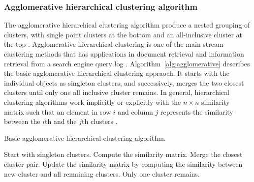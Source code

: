 \subsubsection{Agglomerative hierarchical clustering algorithm}
The agglomerative hierarchical clustering algorithm produce a nested grouping of clusters, with single point clusters at the bottom and an all-inclusive cluster at the top \cite{karypis1999chameleon}. Agglomerative hierarchical clustering is one of the main stream clustering methods \cite{day1984efficient} that has applications in document retrieval \cite{voorhees1986implementing} and information retrieval from a search engine query log \cite{beeferman2000agglomerative}. Algorithm~\ref{alg:agglomerative} describes the basic agglomerative hierarchical clustering appraoch. It starts with the individual objects as singleton clusters, and successively, merges the two closest clusters until only one all inclusive cluster remains. In general, hierarchical clustering algorithms work implicitly or explicitly with the $n \times n$ similarity matrix such that an element in row $i$ and column $j$ represents the similarity between the $i$th and the $j$th clusters \cite{karypis1999chameleon}.


\begin{algorithm}
\caption{Basic agglomerative hierarchical clustering algorithm.} \label{alg:agglomerative}
\begin{algorithmic}[1]
\State Start with singleton clusters.
\State Compute the similarity matrix.
\Repeat
\State Merge the closest cluster pair.
\State Update the similarity matrix by computing the similarity between new cluster and all remaining clusters.
\Until Only one cluster remains.
\end{algorithmic}
\end{algorithm}






